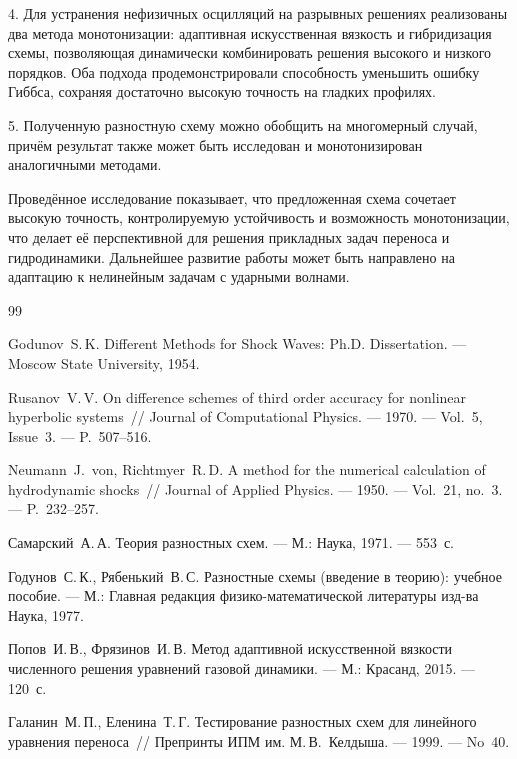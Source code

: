 \documentclass[14pt]{report}
\begin{document}
4. Для устранения нефизичных осцилляций на разрывных решениях реализованы два метода монотонизации: адаптивная искусственная вязкость и гибридизация схемы, позволяющая динамически комбинировать решения высокого и низкого порядков. Оба подхода продемонстрировали способность уменьшить ошибку Гиббса, сохраняя достаточно высокую точность на гладких профилях.

5. Полученную разностную схему можно обобщить на многомерный случай, причём результат также может быть исследован и монотонизирован аналогичными методами.

Проведённое исследование показывает, что предложенная схема сочетает высокую точность, контролируемую устойчивость и возможность монотонизации, что делает её перспективной для решения прикладных задач переноса и гидродинамики. Дальнейшее развитие работы может быть направлено на адаптацию к нелинейным задачам с ударными волнами.

\clearpage



\begin{thebibliography}{99}
Godunov~S.\,K. Different Methods for Shock Waves: Ph.D. Dissertation. --- Moscow State University, 1954.


Rusanov~V.\,V. On difference schemes of third order accuracy for nonlinear hyperbolic systems~// Journal of Computational Physics. --- 1970. --- Vol.~5, Issue~3. --- P.~507--516.

Neumann~J.~von, Richtmyer~R.\,D. A method for the numerical calculation of hydrodynamic shocks~// Journal of Applied Physics. --- 1950. --- Vol.~21, no.~3. --- P.~232--257.

Самарский~А.\,А. Теория разностных схем. --- М.: Наука, 1971. --- 553~с.

Годунов~С.\,К., Рябенький~В.\,С. Разностные схемы (введение в теорию): учебное пособие. --- М.: Главная редакция физико-математической литературы изд-ва \flqq Наука\frqq, 1977.


Попов~И.\,В., Фрязинов~И.\,В. Метод адаптивной искусственной вязкости численного решения уравнений газовой динамики. --- М.: Красанд, 2015. --- 120~с.

Галанин~М.\,П., Еленина~Т.\,Г. Тестирование разностных схем для линейного уравнения переноса~// Препринты ИПМ им. М.\,В.~Келдыша. --- 1999. --- No~40.
\end{thebibliography}
\end{document}
